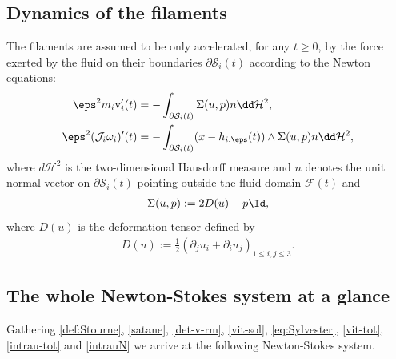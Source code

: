 \subsection{Dynamics of the filaments}
The filaments are assumed to be only accelerated, for any $t\geq0$, by the force exerted by the fluid on their
boundaries $\partial \mathcal S_i (t)$ according to the Newton equations:
\begin{subequations}
\label{intrauN}
\begin{align}
\label{intrau2}
\eps^2 m_i \textrm{v}_i' (t) &= -\int_{\partial \mathcal S_i (t)} \Sigma(u,p) n \dd\mathcal{H}^2,
\\ \label{intrau2bis}
\eps^2 (\mathcal{J}_i \omega_i)' (t) &= -\int_{\partial \mathcal S_i (t)} (x-h_{i,\eps}(t)) \wedge \Sigma(u,p) n \dd\mathcal{H}^2,
\end{align}
\end{subequations}
where $d\mathcal{H}^2$ is the two-dimensional Hausdorff measure and $n$ denotes the unit normal vector on $\partial \mathcal S_i (t) $
pointing outside the fluid domain $\mathcal{F}(t) $ and
\begin{eqnarray}
\label{tensor}
\Sigma(u,p) := 2 D(u) - p \Id,
\end{eqnarray}
where $D(u)$ is the deformation tensor defined by
\begin{eqnarray}
\label{defo}
D(u) := \frac{1}{2} (\partial_{j} u_{i} + \partial_{i} u_{j})_{1 \leqslant i,j \leqslant 3}.
\end{eqnarray}

\subsection{The whole Newton-Stokes system at a glance}
Gathering \eqref{def:Stourne}, \eqref{satane}, \eqref{det-v-rm}, \eqref{vit-sol}, \eqref{eq:Sylvester}, \eqref{vit-tot}, \eqref{intrau-tot} and \eqref{intrauN}
we arrive at the following
Newton-Stokes system.

